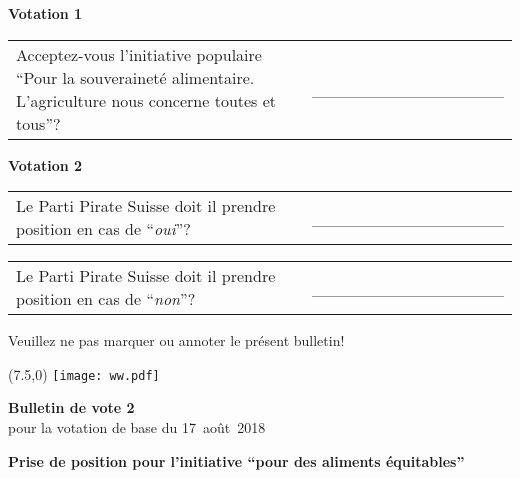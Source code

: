 \documentclass[11pt, a4paper]{scrartcl}
\newcommand{\votingdate}{17~août~2018}
\newcommand{\oui}{\enquote{\textit{oui}}}
\newcommand{\non}{\enquote{\textit{non}}}
\begin{document}
{\begin{minipage}[t][12.5cm][t]{17.7cm}
\vspace{1cm}

\textbf{Votation 1}

\vspace{0.5cm}

\begin{tabular}{ b{13.5cm} b{3cm} }
Acceptez-vous l'initiative populaire \enquote{Pour la souveraineté alimentaire. L’agriculture nous concerne toutes et tous}?
& \_\_\_\_\_\_\_\_\_\_\_\_\_\_\_\_ \\
\end{tabular}

\vspace{0.5cm}

\textbf{Votation 2}

\vspace{0.5cm}

\begin{tabular}{ b{13.5cm} b{3cm} }
Le Parti Pirate Suisse doit il prendre position en cas de \oui{}?
& \_\_\_\_\_\_\_\_\_\_\_\_\_\_\_\_ \\
\end{tabular}

\vspace{0.5cm}

\begin{tabular}{ b{13.5cm} b{3cm} }
Le Parti Pirate Suisse doit il prendre position en cas de \non{}?
& \_\_\_\_\_\_\_\_\_\_\_\_\_\_\_\_ \\
\end{tabular}

\vspace{0.5cm}

Veuillez ne pas marquer ou annoter le présent bulletin!


\end{minipage}


\newpage

\begin{minipage}[t][12.5cm][t]{17.7cm}

\begin{textblock}{6}(7.5,0)
\texttt{[image: ww.pdf]}
\end{textblock}

{\LARGE\textbf{Bulletin de vote 2}} \\
pour la votation de base du \votingdate{} \\

\vspace{2cm}

\textbf{Prise de position pour l'initiative \enquote{pour des aliments équitables}}


\end{minipage}}
\end{document}
